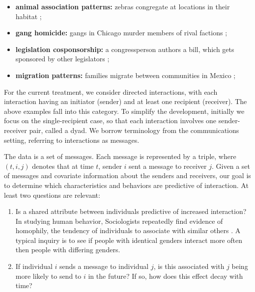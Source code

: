\documentclass[aoas,preprint]{imsart}
\begin{document}
\begin{itemize}
    \item\textbf{animal association patterns:} zebras congregate at
    locations in their habitat \cite{sundaresan2007network};
    
    \item\textbf{gang homicide:} gangs in Chicago murder members of rival factions
    \cite{papachristos2009murder};

    \item\textbf{legislation cosponsorship:} a congressperson authors a bill, which
    gets sponsored by other legislators \cite{fowler2006connecting};

    \item\textbf{migration patterns:} families migrate between communities in
    Mexico \cite{mckenzie2007network};
\end{itemize}

For the current treatment, we consider directed interactions, with each
interaction having an initiator (sender) and at least one recipient
(receiver).  The above examples fall into this category.  To simplify
the development, initially we focus on the single-recipient case, so that
each interaction involves one sender-receiver pair, called a dyad.  We
borrow terminology from the communications setting, referring to
interactions as messages.

The data is a set of messages.  Each message is represented by a triple,
where $(t,i,j)$ denotes that at time $t$, sender $i$ sent a message to
receiver $j$.  Given a set of messages and covariate information about the
senders and receivers, our goal is to determine which characteristics and
behaviors are predictive of interaction.  At least two questions are
relevant:

\begin{enumerate}
    \item Is a shared attribute between individuals predictive of increased
    interaction?  In studying human behavior, Sociologists repeatedly find
    evidence of homophily, the tendency of individuals to associate with
    similar others \cite{mcpherson2001birds}. A typical inquiry is
    to see if people with identical genders interact more often then
    people with differing genders.

    \item If individual $i$ sends a message to individual $j$, is this
    associated with $j$ being more likely to send to $i$ in the future?
    If so, how does this effect decay with time?
\end{enumerate}
\end{document}
